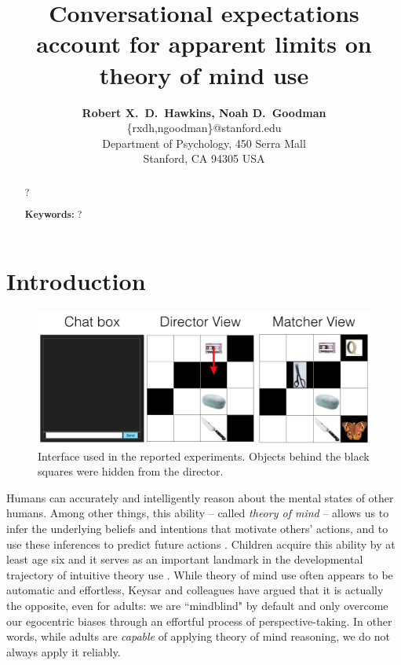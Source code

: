 \documentclass[10pt,letterpaper]{article}
\title{Conversational expectations account for apparent limits on theory of mind use}
\author{{\large \bf Robert X.~D.~Hawkins, Noah D.~Goodman}\\
  \{rxdh,ngoodman\}@stanford.edu\\
  Department of Psychology, 450 Serra Mall \\
  Stanford, CA 94305 USA}
\begin{document}
\maketitle

\begin{abstract}
?

\textbf{Keywords:} 
?
\end{abstract}

\section{Introduction}
\label{sec:intro}

\begin{figure}[t!]
\begin{center}
\includegraphics[scale = .5]{images/overall_view.png}
\end{center}
\vspace{-.25cm}
\caption{Interface used in the reported experiments. Objects behind the black squares were hidden from the director.}
\label{fig:interface}
\end{figure}

Humans can accurately and intelligently reason about the mental states of other humans. Among other things, this ability -- called \emph{theory of mind} \cite{PremackWoodruff78_ChimpanzeeToM} -- allows us to infer the underlying beliefs and intentions that motivate others' actions, and to use these inferences to predict future actions \cite{BakerSaxeTenenbaum09_ActionUnderstandingInversePlanning}. Children acquire this ability by at least age six \cite{WimmerPerner83_BeliefsAboutBeliefs, WellmanCrossWatson01_ToMMetaAnalysis} and it serves as an important landmark in the developmental trajectory of intuitive theory use \cite{GopnikWellman12_ReconstructingConstructivism}.
%
While theory of mind use often appears to be automatic and effortless, Keysar and colleagues \cite{KeysarBarr___Brauner00_TakingPerspective, KeysarLinBarr03_LimitsOnTheoryOfMindUse, LinKeysarEpley10_ReflexivelyMindblind} have argued that it is actually the opposite, even for adults: we are ``mindblind" by default and only overcome our egocentric biases through an effortful process of perspective-taking. In other words, while adults are \emph{capable} of applying theory of mind reasoning, we do not always apply it reliably. 
\end{document}
